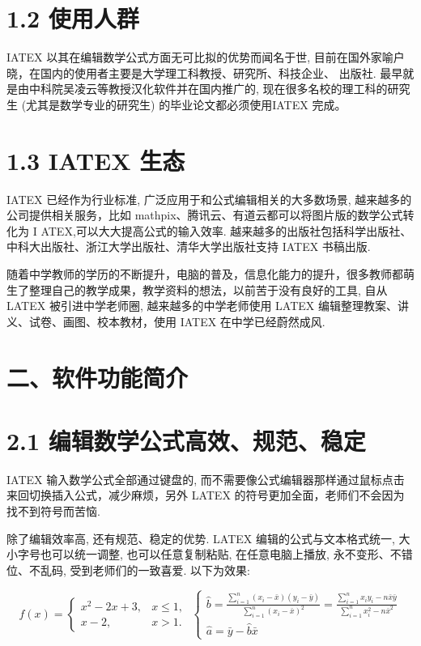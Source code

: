 \documentclass[10pt]{article}
\begin{document}
\section*{1.2 使用人群}

IATEX 以其在编辑数学公式方面无可比拟的优势而闻名于世, 目前在国外家喻户晓，在国内的使用者主要是大学理工科教授、研究所、科技企业、 出版社. 最早就是由中科院吴凌云等教授汉化软件并在国内推广的, 现在很多名校的理工科的研究生 (尤其是数学专业的研究生) 的毕业论文都必须使用IATEX 完成。

\section*{1.3 IATEX 生态}

IATEX 已经作为行业标准, 广泛应用于和公式编辑相关的大多数场景, 越来越多的公司提供相关服务，比如 mathpix、腾讯云、有道云都可以将图片版的数学公式转化为 \(\mathrm{I}\) ATEX,可以大大提高公式的输入效率. 越来越多的出版社包括科学出版社、中科大出版社、浙江大学出版社、清华大学出版社支持 IATEX 书稿出版.

随着中学教师的学历的不断提升，电脑的普及，信息化能力的提升，很多教师都萌生了整理自己的教学成果，教学资料的想法，以前苦于没有良好的工具, 自从 LATEX 被引进中学老师圈, 越来越多的中学老师使用 LATEX 编辑整理教案、讲义、试卷、画图、校本教材，使用 IATEX 在中学已经蔚然成风.

\section*{二、软件功能简介}

\section*{2.1 编辑数学公式高效、规范、稳定}

IATEX 输入数学公式全部通过键盘的, 而不需要像公式编辑器那样通过鼠标点击来回切换插入公式，减少麻烦，另外 LATEX 的符号更加全面，老师们不会因为找不到符号而苦恼.

除了编辑效率高, 还有规范、稳定的优势. LATEX 编辑的公式与文本格式统一, 大小字号也可以统一调整, 也可以任意复制粘贴, 在任意电脑上播放, 永不变形、不错位、不乱码, 受到老师们的一致喜爱. 以下为效果:

\[
f\left( x\right)  = \left\{  \begin{array}{ll} {x}^{2} - {2x} + 3, & x \leq  1, \\  x - 2, & x > 1. \end{array}\right. \;\left\{  \begin{array}{l} \widehat{b} = \frac{\mathop{\sum }\limits_{{i = 1}}^{n}\left( {{x}_{i} - \bar{x}}\right) \left( {{y}_{i} - \bar{y}}\right) }{\mathop{\sum }\limits_{{i = 1}}^{n}{\left( {x}_{i} - \bar{x}\right) }^{2}} = \frac{\mathop{\sum }\limits_{{i = 1}}^{n}{x}_{i}{y}_{i} - n\bar{x}\bar{y}}{\mathop{\sum }\limits_{{i = 1}}^{n}{x}_{i}^{2} - n{\bar{x}}^{2}} \\  \widehat{a} = \bar{y} - \widehat{b}\bar{x} \end{array}\right.
\]
\end{document}
